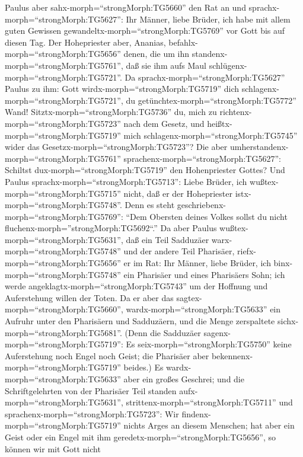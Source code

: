  Paulus aber sahx-morph=``strongMorph:TG5660'' den Rat an
und sprachx-morph=``strongMorph:TG5627'': Ihr Männer, liebe Brüder, ich
habe mit allem guten Gewissen gewandeltx-morph=``strongMorph:TG5769''
vor Gott bis auf diesen Tag.  Der Hohepriester aber,
Ananias, befahlx-morph=``strongMorph:TG5656'' denen, die um ihn
standenx-morph=``strongMorph:TG5761'', daß sie ihm aufs Maul
schlügenx-morph=``strongMorph:TG5721''.  Da
sprachx-morph=``strongMorph:TG5627'' Paulus zu ihm: Gott
wirdx-morph=``strongMorph:TG5719'' dich
schlagenx-morph=``strongMorph:TG5721'', du
getünchtex-morph=``strongMorph:TG5772'' Wand!
Sitztx-morph=``strongMorph:TG5736'' du, mich zu
richtenx-morph=``strongMorph:TG5723'' nach dem Gesetz, und
heißtx-morph=``strongMorph:TG5719'' mich
schlagenx-morph=``strongMorph:TG5745'' wider das
Gesetzx-morph=``strongMorph:TG5723''?  Die aber
umherstandenx-morph=``strongMorph:TG5761''
sprachenx-morph=``strongMorph:TG5627'': Schiltst
dux-morph=``strongMorph:TG5719'' den Hohenpriester Gottes? 
Und Paulus sprachx-morph=``strongMorph:TG5713'': Liebe Brüder, ich
wußtex-morph=``strongMorph:TG5715'' nicht, daß er der Hohepriester
istx-morph=``strongMorph:TG5748''. Denn es steht
geschriebenx-morph=``strongMorph:TG5769'': ``Dem Obersten deines Volkes
sollst du nicht fluchenx-morph=''strongMorph:TG5692``.''  Da
aber Paulus wußtex-morph=``strongMorph:TG5631'', daß ein Teil Sadduzäer
warx-morph=``strongMorph:TG5748'' und der andere Teil Pharisäer,
riefx-morph=``strongMorph:TG5656'' er im Rat: Ihr Männer, liebe Brüder,
ich binx-morph=``strongMorph:TG5748'' ein Pharisäer und eines Pharisäers
Sohn; ich werde angeklagtx-morph=``strongMorph:TG5743'' um der Hoffnung
und Auferstehung willen der Toten.  Da er aber das
sagtex-morph=``strongMorph:TG5660'', wardx-morph=``strongMorph:TG5633''
ein Aufruhr unter den Pharisäern und Sadduzäern, und die Menge
zerspaltete sichx-morph=``strongMorph:TG5681''.  (Denn die
Sadduzäer sagenx-morph=``strongMorph:TG5719'': Es
seix-morph=``strongMorph:TG5750'' keine Auferstehung noch Engel noch
Geist; die Pharisäer aber bekennenx-morph=``strongMorph:TG5719''
beides.)  Es wardx-morph=``strongMorph:TG5633'' aber ein
großes Geschrei; und die Schriftgelehrten von der Pharisäer Teil standen
aufx-morph=``strongMorph:TG5631'',
strittenx-morph=``strongMorph:TG5711'' und
sprachenx-morph=``strongMorph:TG5723'': Wir
findenx-morph=``strongMorph:TG5719'' nichts Arges an diesem Menschen;
hat aber ein Geist oder ein Engel mit ihm
geredetx-morph=``strongMorph:TG5656'', so können wir mit Gott nicht
